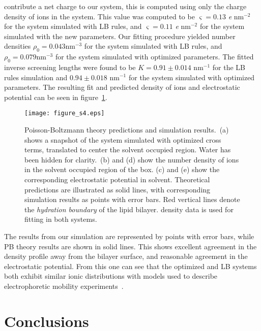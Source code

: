contribute a net charge to our system, this is computed using only the
charge density of ions in the system. 
This value was computed to be $\varsigma=0.13$ \emph{e} nm$^{-2}$ for the system simulated with LB rules, and 
$\varsigma=0.11$ \emph{e} nm$^{-2}$ for the system simulated with the new parameters.
Our fitting procedure yielded 
number densities $\rho _{0}=0.043\text{nm}^{-3}$ for the system simulated with LB rules, 
and $\rho _{0}=0.079\text{nm}^{-3}$ for the system simulated with optimized parameters.
The fitted inverse screening lengths were found to be $K=0.91 \pm 0.014$ nm$^{-1}$ for the LB rules simulation 
and $0.94 \pm 0.018$ nm$^{-1}$ for the system simulated with optimized parameters.
The resulting fit and predicted
density of \na ions and electrostatic potential can be seen in
figure~\ref{figch2:gouy}. 
\begin{figure}
    \caption[Poisson-Boltzmann theory predictions and simulation results.]{
        Poisson-Boltzmann theory predictions and simulation results.\ (a) shows a snapshot of the 
system simulated with optimized cross terms, translated
to center the solvent occupied region. Water has been hidden
for clarity.\ (b) and (d)
    show the number density of ions in the solvent occupied region of the box. 
    (c) and (e) show the corresponding electrostatic potential in solvent.
    Theoretical predictions are illustrated as solid lines, with corresponding 
    simulation results as points with error bars. Red vertical lines denote the \emph{hydration boundary} of the lipid bilayer. 
    \cl{} density data is used for fitting in both systems. 
}
    \label{figch2:gouy}
    \texttt{[image: figure\_s4.eps]}
\end{figure}
The results from our simulation are
represented by points with error bars, while PB theory results are
shown in solid lines.  This shows excellent agreement in the \na{} density
profile away from the bilayer surface, and reasonable agreement in the
electrostatic potential. From this one can see that the optimized and LB
systems both exhibit similar ionic distributions with models used to
describe electrophoretic mobility
experiments~\cite{israelachvili:2011:intermol}.

\section{Conclusions}

